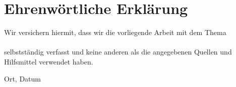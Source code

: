 \clearpage
\chapter*{Ehrenwörtliche Erklärung}

Wir versichern hiermit, dass wir die vorliegende Arbeit
 mit dem Thema \newline\\[2mm] \textbf{\textit{\DerTitelDerArbeit}} \newline\\[2mm] selbstständig verfasst und keine anderen als die angegebenen Quellen und
Hilfsmittel verwendet haben.

\vspace{3cm}
Ort, Datum \hfill \DerAutorDerArbeit
